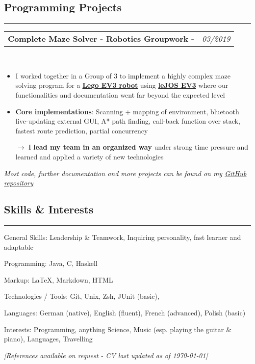 \documentclass[10pt,letterpaper]{article}
\makeatletter
\newcommand{\headerrow}[2]
{\begin{tabular*}{\linewidth}{l@{\extracolsep{\fill}}r}
	#1 &
	#2 \\
\end{tabular*}}
\makeatother
\begin{document}
\subsection*{\Large{Programming Projects}}
\hrule
\vspace{0.4em}
\noindent
\headerrow{\textbf{Complete Maze Solver - Robotics Groupwork - \fbox{20/20}}}{\emph{03/2019}}
\\
\vspace{-1.6em}
\begin{itemize}
	\item I worked together in a Group of 3 to implement a highly complex maze solving program for a \href{https://education.lego.com/en-gb/product/mindstorms-ev3}{\textbf{Lego EV3 robot}} using \href{http://www.lejos.org/}{\textbf{leJOS EV3}} where our functionalities and documentation went far beyond the expected level
	\item \textbf{Core implementations}: Scanning + mapping of environment, bluetooth live-updating external GUI, A* path finding, 
	call-back function over stack, fastest route prediction, partial concurrency
	\item[$\rightarrow$] I \textbf{lead my team in an organized way} under strong time pressure and learned and applied a variety of new technologies
\end{itemize}
\emph{Most code, further documentation and more projects can be found on my \href{https://github.com/j0ner0n}{\underline{GitHub repository}}}

\subsection*{\Large{Skills \& Interests}}
\hrule
\vspace{0.4em}
\begin{description*}
	\item[General Skills:]
	Leadership \& Teamwork, Inquiring personality, fast learner and adaptable
	\item[Programming:]
	Java, C, Haskell
   \item[Markup:]
   \LaTeX, Markdown, HTML
	\item[Technologies / Tools:]
	Git, Unix, Zsh, JUnit (basic), 
	\item[Languages:]
	German (native), English (fluent), French (advanced), Polish (basic)
   	\item[Interests:]
	Programming, anything Science, Music (esp. playing the guitar \& piano), Languages, Travelling
\end{description*}



\hfill \small \textit{[References available on request - CV last updated as of {\today}]}
\end{document}
